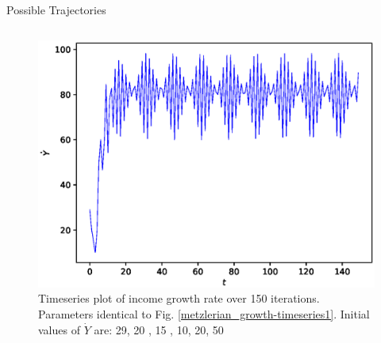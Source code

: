 \documentclass{beamer}
\begin{document}
\begin{frame}{Possible Trajectories}
\begin{columns}
\begin{column}{0.5\textwidth}
\begin{figure}
			\includegraphics[width=1.0\textwidth]{timeseries3.eps}
			\caption{Timeseries plot of income growth rate over 150 iterations. Parameters identical to Fig. \ref{metzlerian_growth-timeseries1}. Initial values of $\dot Y$ are: 29, 20 , 15 , 10, 20, 50}
		\end{figure}
	\end{column}
	\end{columns}
\end{frame}
\end{document}
